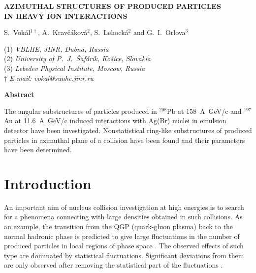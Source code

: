 \documentclass[12pt]{article}
\begin{document}
\begin{center}
{\bfseries AZIMUTHAL STRUCTURES OF PRODUCED PARTICLES\\
 IN HEAVY ION INTERACTIONS}

\vskip 5mm

S.~Vok\'al$^{1 \dag}$, A.~Krav\v c\'akov\'a$^{2}$, S.~Lehock\'a$^{2}$ and G.~I.~Orlova$^{3}$

\vskip 5mm

{\small
(1) {\it
VBLHE, JINR, Dubna, Russia
}
\\
(2) {\it
University of  P.~J.~\v{S}af\'arik, Ko\v{s}ice, Slovakia
}
\\
(3) {\it
Lebedev Physical Institute, Moscow, Russia
}
\\
$\dag$ {\it
E-mail: vokal@sunhe.jinr.ru
}}
\end{center}

\vskip 5mm

\begin{center}
\begin{minipage}{150mm}
\centerline{\bf Abstract}
The angular substructures of particles produced in ${}^{208}$Pb at 158~A~GeV/c and ${}^{197}$Au at 11.6~A~GeV/c induced interactions with Ag(Br) nuclei in emulsion detector have been investigated. Nonstatistical ring-like substructures of produced particles in azimuthal plane of a collision have been found and their parameters have been determined. 
\end{minipage}
\end{center}

\vskip 10mm


\section{Introduction}

An important aim of nucleus collision investigation at high energies is to search for a phenomena connecting with large densities obtained in such collisions. As an example, the transition from the QGP (quark-gluon plasma) back to the normal hadronic phase is predicted to give large fluctuations in the number of produced particles in local regions of phase space \cite{bib01,bib02}. The observed effects of such type are dominated by statistical fluctuations. Significant deviations from them are only observed after removing the statistical part of the fluctuations \cite{bib03}.
\end{document}
